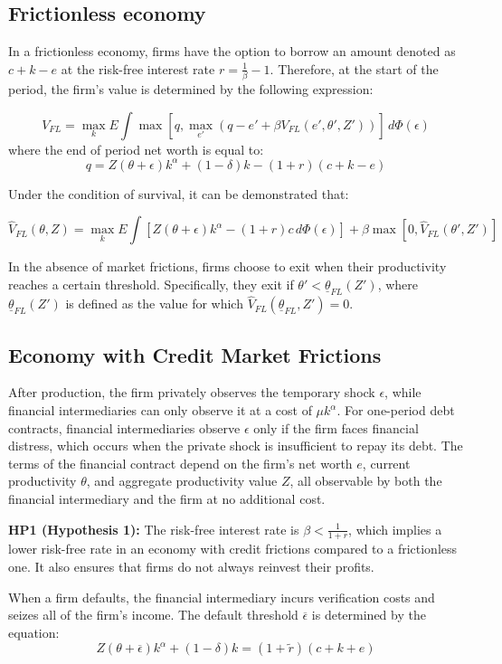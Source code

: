 \documentclass[12pt]{article}
\begin{document}
\subsection{Frictionless economy}
In a frictionless economy, firms have the option to borrow an amount denoted as \(c+k-e\) at the risk-free interest rate
\(r=\frac{1}{\beta}-1\). Therefore, at the start of the period, the firm's value is determined by the following
expression:

\[V_{FL} = \max_{k} E \int \max[q,\max_{e'}(q - e' + \beta V_{FL}(e',\theta', Z'))]  \,d\Phi
(\epsilon) \]
where the end of period net worth is equal to:
\[q=Z(\theta+\epsilon)k^\alpha + (1-\delta )k-(1+r)(c+k-e)\]

Under the condition of survival, it can be demonstrated that:

\[\widehat{V}_{FL}(\theta,Z) = \max_{k}E\int[Z(\theta+\epsilon)k^\alpha - (1+r)c\,d\Phi (\epsilon)] +
\beta\max[0,\widehat{V}_{FL}(\theta',Z')]\]

In the absence of market frictions, firms choose to exit when their productivity reaches a certain threshold.
Specifically, they exit if \(\theta'<\underline{\theta} _{FL}(Z')\), where \(\underline{\theta}
_{FL}(Z')\) is defined as the value
for which \(\widehat{V}_{FL}(\underline{\theta}_{FL},Z')=0\).

\subsection{Economy with Credit Market Frictions}

After production, the firm privately observes the temporary shock $\epsilon$, while financial intermediaries can only
observe it at a cost of $\mu k^\alpha$. For one-period debt contracts, financial intermediaries observe $\epsilon$ only
if the firm faces financial distress, which occurs when the private shock is insufficient to repay its debt. The terms
of the financial contract depend on the firm's net worth $e$, current productivity $\theta$, and aggregate productivity
value $Z$, all observable by both the financial intermediary and the firm at no additional cost.

\textbf{HP1 (Hypothesis 1):} The risk-free interest rate is $\beta < \frac{1}{1+r}$, which implies a lower risk-free
rate in an economy with credit frictions compared to a frictionless one. It also ensures that firms do not always
reinvest their profits.

When a firm defaults, the financial intermediary incurs verification costs and seizes all of the firm's income. The
default threshold $\overline{\epsilon}$ is determined by the equation:
\[
Z(\theta+\overline{\epsilon})k^\alpha + (1-\delta)k = (1+\widetilde{r} )(c+k+e)
\]
\end{document}
